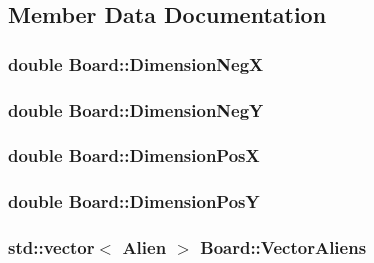 \subsection{Member Data Documentation}
\hypertarget{classBoard_a405af5d01cf8db9e6c08b26c840b1087}{
\subsubsection[{Dimension\-Neg\-X}]{\setlength{\rightskip}{0pt plus 5cm}double Board\-::\-Dimension\-Neg\-X\hspace{0.3cm}{\ttfamily [private]}}}\label{classBoard_a405af5d01cf8db9e6c08b26c840b1087}
\hypertarget{classBoard_a996f58b7d1c0083ebbcc03ffdbb8e1b1}{
\subsubsection[{Dimension\-Neg\-Y}]{\setlength{\rightskip}{0pt plus 5cm}double Board\-::\-Dimension\-Neg\-Y\hspace{0.3cm}{\ttfamily [private]}}}\label{classBoard_a996f58b7d1c0083ebbcc03ffdbb8e1b1}
\hypertarget{classBoard_ac704686efaa5a36464d53fb7cf4275bc}{
\subsubsection[{Dimension\-Pos\-X}]{\setlength{\rightskip}{0pt plus 5cm}double Board\-::\-Dimension\-Pos\-X\hspace{0.3cm}{\ttfamily [private]}}}\label{classBoard_ac704686efaa5a36464d53fb7cf4275bc}
\hypertarget{classBoard_abb6a7d3b83b0bba5e8b93ad3c4446777}{
\subsubsection[{Dimension\-Pos\-Y}]{\setlength{\rightskip}{0pt plus 5cm}double Board\-::\-Dimension\-Pos\-Y\hspace{0.3cm}{\ttfamily [private]}}}\label{classBoard_abb6a7d3b83b0bba5e8b93ad3c4446777}
\hypertarget{classBoard_a8314122d17536c280bebf1c015522175}{
\subsubsection[{Vector\-Aliens}]{\setlength{\rightskip}{0pt plus 5cm}std\-::vector$<$ {\bf Alien} $>$ Board\-::\-Vector\-Aliens\hspace{0.3cm}{\ttfamily [private]}}}\label{classBoard_a8314122d17536c280bebf1c015522175}
